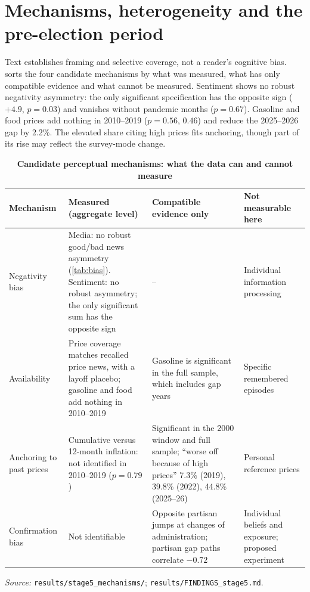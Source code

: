 \documentclass[11pt]{article}
\begin{document}
\section{Mechanisms, heterogeneity and the pre-election period}\label{sec:mech}

 Text establishes framing and selective coverage, not a reader's cognitive bias.  sorts the four candidate mechanisms by what was measured, what has only compatible evidence and what cannot be measured. Sentiment shows no robust negativity asymmetry: the only significant specification has the opposite sign ($+4.9$, $p = 0.03$) and vanishes without pandemic months ($p = 0.67$). Gasoline and food prices add nothing in 2010–2019 ($p = 0.56$, $0.46$) and reduce the 2025–2026 gap by 2.2\%. The elevated share citing high prices fits anchoring, though part of its rise may reflect the survey-mode change.

\begin{table}[htbp]
\centering
\begin{threeparttable}
\caption{\textbf{Candidate perceptual mechanisms: what the data can and cannot measure}}
\label{tab:mech}
\footnotesize
\begin{tabularx}{\textwidth}{@{}>{\raggedright\arraybackslash}p{} >{\raggedright\arraybackslash}X >{\raggedright\arraybackslash}X >{\raggedright\arraybackslash}p{}@{}}
\toprule
Mechanism & Measured (aggregate level) & Compatible evidence only & Not measurable here\\
\midrule
Negativity bias & Media: no robust good/bad news asymmetry (\cref{tab:bias}). Sentiment: no robust asymmetry; the only significant sum has the opposite sign & -- & Individual information processing\\
Availability & Price coverage matches recalled price news, with a layoff placebo; gasoline and food add nothing in 2010–2019 & Gasoline is significant in the full sample, which includes gap years & Specific remembered episodes\\
Anchoring to past prices & Cumulative versus 12-month inflation: not identified in 2010–2019 ($p = 0.79$) & Significant in the 2000 window and full sample; ``worse off because of high prices'' 7.3\% (2019), 39.8\% (2022), 44.8\% (2025–26) & Personal reference prices\\
Confirmation bias & Not identifiable & Opposite partisan jumps at changes of administration; partisan gap paths correlate $-0.72$ & Individual beliefs and exposure; proposed experiment\\
\bottomrule
\end{tabularx}
\begin{tablenotes}[flushleft]\footnotesize
\item \textit{Source:} \texttt{results/stage5\_mechanisms/}; \texttt{results/FINDINGS\_stage5.md}.
\end{tablenotes}
\end{threeparttable}
\end{table}
\end{document}
